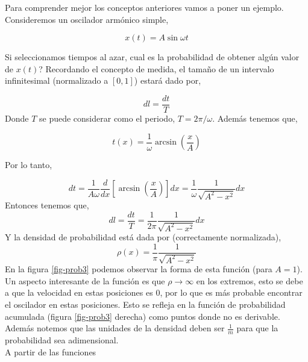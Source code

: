 \documentclass[executivepaper,12pt]{article}
\numberwithin{equation}{section}
\begin{document}
Para comprender mejor los conceptos anteriores vamos a poner un ejemplo. Consideremos un oscilador armónico simple, 

\begin{equation*}
	x(t)=A\sin\omega t
\end{equation*}

Si seleccionamos tiempos al azar, cual es la probabilidad de obtener algún valor de $x(t)$? Recordando el concepto de medida, el tamaño de un intervalo infinitesimal (normalizado a $[0,1]$) estará dado por,

\begin{equation}
	dl=\frac{dt}{T}
\end{equation} 
Donde $T$ se puede considerar como el periodo, $T=2\pi/\omega$. Además tenemos que,

\begin{equation}
	t(x)=\frac{1}{\omega}\arcsin\left(\frac{x}{A}\right)
\end{equation}

Por lo tanto, 

\begin{equation}
	dt=\frac{1}{A\omega}\frac{d}{dx}\left[\arcsin\left(\frac{x}{A}\right)\right]dx=\frac{1}{\omega}\frac{1}{\sqrt{A^2-x^2}} dx
\end{equation}
Entonces tenemos que,
\begin{equation*}
	dl=\frac{dt}{T}=\frac{1}{2\pi}\frac{1}{\sqrt{A^2-x^2}} dx
\end{equation*}
Y la densidad de probabilidad está dada por (correctamente normalizada),
\begin{equation}
	\rho(x)=\frac{1}{\pi}\frac{1}{\sqrt{A^2-x^2}}
\end{equation}
 En la figura \ref{fig-prob3} podemos observar la forma de esta función (para $A=1$). Un aspecto interesante de la función es que $\rho \to \infty $ en los extremos, esto se debe a que la velocidad en estas posiciones es $0$, por lo que es más probable encontrar el oscilador en estas posiciones. Esto se refleja en la función de probabilidad acumulada (figura \ref{fig-prob3} derecha) como puntos donde no es derivable. Además notemos que las unidades de la densidad deben ser $\frac{1}{m}$ para que la probabilidad sea adimensional.\\
 
 A partir de las funciones  
  
\end{document}
